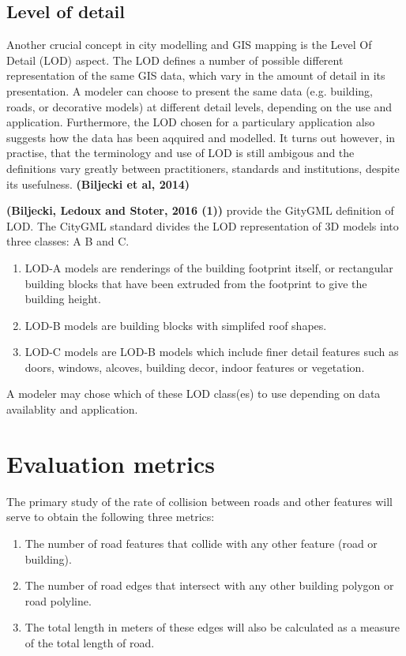 \documentclass{kththesis}
\begin{document}
\subsection{Level of detail}

Another crucial concept in city modelling and GIS mapping is the Level Of Detail (LOD) aspect.
The LOD defines a number of possible different representation of the same GIS data, which vary in the amount of detail in its presentation.
A modeler can choose to present the same data (e.g. building, roads, or decorative models) at different detail levels, depending on the use and application.
Furthermore, the LOD chosen for a particulary application also suggests how the data has been aqquired and modelled.
It turns out however, in practise, that the terminology and use of LOD is still ambigous and the definitions vary greatly between practitioners, standards and institutions, despite its usefulness.
\textbf{(Biljecki et al, 2014)}

\textbf{(Biljecki, Ledoux and Stoter, 2016 (1))} provide the GityGML definition of LOD.
The CityGML standard divides the LOD representation of 3D models into three classes: A B and C.
\begin{enumerate}
    \item LOD-A models are renderings of the building footprint itself, or rectangular building blocks that have been extruded from the footprint to give the building height.
    \item LOD-B models are building blocks with simplifed roof shapes.
    \item LOD-C models are LOD-B models which include finer detail features such as doors, windows, alcoves, building decor, indoor features or vegetation.
\end{enumerate}
A modeler may chose which of these LOD class(es) to use depending on data availablity and application.

\section{Evaluation metrics}

The primary study of the rate of collision between roads and other features will serve to obtain the following three metrics:

\begin{enumerate}
    \item The number of road features that collide with any other feature (road or building).
    \item The number of road edges that intersect with any other building polygon or road polyline.
    \item The total length in meters of these edges will also be calculated as a measure of the total length of road.
\end{enumerate}
\end{document}
